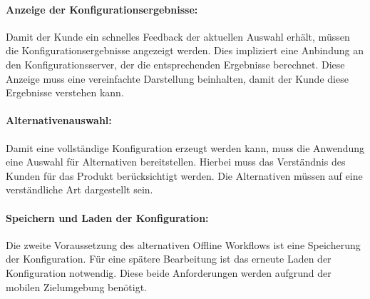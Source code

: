 \paragraph{Anzeige der Konfigurationsergebnisse: } Damit der Kunde ein schnelles Feedback der aktuellen Auswahl erhält, müssen die Konfigurationsergebnisse angezeigt werden. Dies impliziert eine Anbindung an den Konfigurationsserver, der die entsprechenden Ergebnisse berechnet. Diese Anzeige muss eine vereinfachte Darstellung beinhalten, damit der Kunde diese Ergebnisse verstehen kann.

\paragraph{Alternativenauswahl: } Damit eine vollständige Konfiguration erzeugt werden kann, muss die Anwendung eine Auswahl für Alternativen bereitstellen. Hierbei muss das Verständnis des Kunden für das Produkt berücksichtigt werden. Die Alternativen müssen auf eine verständliche Art dargestellt sein. 

\paragraph{Speichern und Laden der Konfiguration: } Die zweite Voraussetzung des alternativen Offline Workflows ist eine Speicherung der Konfiguration. Für eine spätere Bearbeitung ist das erneute Laden der Konfiguration notwendig. Diese beide Anforderungen werden aufgrund der mobilen Zielumgebung benötigt.

